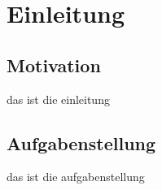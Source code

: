 \chapter{Einleitung}

\section{Motivation}
\label{sec:Sektion 1}
das ist die einleitung
\section{Aufgabenstellung}
\label{sec:Sektion 2}
das ist die aufgabenstellung
